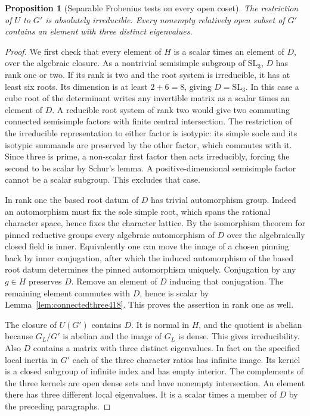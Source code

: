 \documentclass[a4paper,11pt]{article}
\newtheorem{proposition}{Proposition}[section]
\theoremstyle{definition}
\theoremstyle{remark}
\numberwithin{equation}{section}
\begin{document}
\begin{proposition}[Separable Frobenius tests on every open coset]\leavevmode
\label{prop:regularthree418}
The restriction of \(U\) to \(G'\) is absolutely irreducible.
Every nonempty relatively open subset of \(G'\) contains
an element with three distinct eigenvalues.
\end{proposition}
\begin{proof}
We first check that every element of \(H\) is a scalar times
an element of \(D\), over the algebraic closure. As a
nontrivial semisimple subgroup of \(\mathrm{SL}_3\), \(D\)
has rank one or two. If its rank is two and the root system
is irreducible, it has at least six roots. Its dimension is
at least \(2+6=8\), giving \(D=\mathrm{SL}_3\). In this case
a cube root of the determinant writes any invertible matrix
as a scalar times an element of \(D\). A reducible root
system of rank two would give two commuting connected
semisimple factors with finite central intersection. The
restriction of the irreducible representation to either
factor is isotypic: its simple socle and its isotypic
summands are preserved by the other factor, which commutes
with it. Since three is prime, a non-scalar first factor
then acts irreducibly, forcing the second to be scalar by
Schur's lemma. A positive-dimensional semisimple factor cannot
be a scalar subgroup. This excludes that case.

In rank one the based root datum of \(D\) has trivial
automorphism group. Indeed an automorphism must fix the sole
simple root, which spans the rational character space, hence
fixes the character lattice. By the isomorphism theorem for
pinned reductive groups every algebraic automorphism of \(D\)
over the algebraically closed field is inner. Equivalently
one can move the image of a chosen pinning back by inner
conjugation, after which the induced automorphism of the
based root datum determines the pinned automorphism uniquely.
Conjugation by any \(g\in H\) preserves \(D\). Remove an
element of \(D\) inducing that conjugation. The remaining
element commutes with \(D\), hence is scalar by
Lemma~\ref{lem:connectedthree418}. This proves the assertion
in rank one as well.~\cite{IX-VII-VI-milne122}

The closure of \(U(G')\) contains \(D\). It is normal in
\(H\), and the quotient is abelian because \(G_L/G'\) is
abelian and the image of \(G_L\) is dense. This gives
irreducibility. Also \(D\) contains a matrix with three
distinct eigenvalues. In fact on the specified local
inertia in \(G'\) each of the three character ratios has
infinite image. Its kernel is a closed subgroup of infinite
index and has empty interior. The complements of the three
kernels are open dense sets and have nonempty intersection.
An element there has three different local eigenvalues.
It is a scalar times a member of \(D\) by the preceding
paragraphs.


\end{proof}
\end{document}
